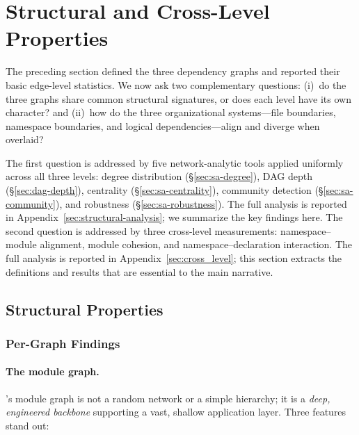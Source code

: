 \section{Structural and Cross-Level Properties}
\label{sec:structural-overview}
The preceding section defined the three dependency graphs and reported their basic edge-level statistics. We now ask two complementary questions: (i)~do the three graphs share common structural signatures, or does each level have its own character? and (ii)~how do the three organizational systems---file boundaries, namespace boundaries, and logical dependencies---align and diverge when overlaid?

The first question is addressed by five network-analytic tools applied uniformly across all three levels: degree distribution (\S\ref{sec:sa-degree}), DAG depth (\S\ref{sec:dag-depth}), centrality (\S\ref{sec:sa-centrality}), community detection (\S\ref{sec:sa-community}), and robustness (\S\ref{sec:sa-robustness}). The full analysis is reported in Appendix~\ref{sec:structural-analysis}; we summarize the key findings here. The second question is addressed by three cross-level measurements: namespace--module alignment, module cohesion, and namespace--declaration interaction. The full analysis is reported in Appendix~\ref{sec:cross_level}; this section extracts the definitions and results that are essential to the main narrative.

\subsection{Structural Properties}
\label{sec:structural-summary}
\label{sec:graph-analysis}

\subsubsection{Per-Graph Findings}

\paragraph{The module graph.}
\label{sec:module_conclusion}
's module graph is not a random network or a simple hierarchy; it is a \textit{deep, engineered backbone} supporting a vast, shallow application layer. Three features stand out:

